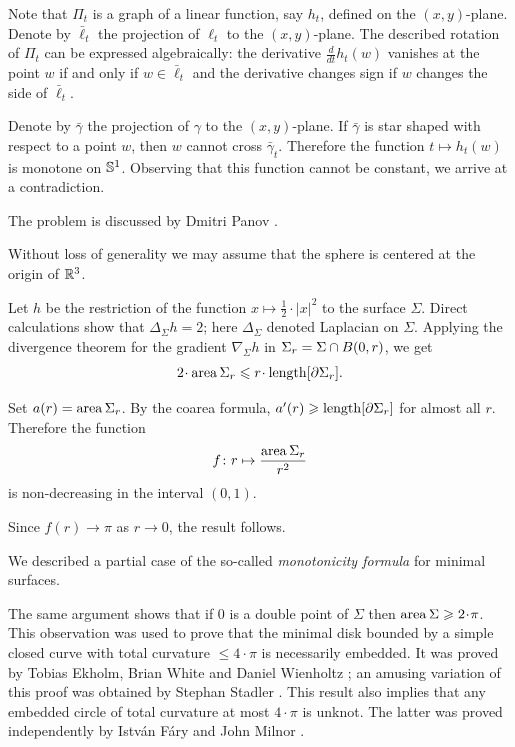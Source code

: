 Note that $\Pi_t$ is a graph of a linear function, say $h_t$, defined on the $(x, y)$-plane.
Denote by $\bar\ell_t$ the projection of $\ell_t$ to the $(x, y)$-plane.
The described rotation of $\Pi_t$ can be expressed algebraically:
the derivative $\tfrac{d}{dt}h_t(w)$ vanishes at the point $w$ if and only if $w\in \bar\ell_t$ 
and the derivative changes sign if $w$ changes the side of $\bar\ell_t$.

Denote by $\bar\gamma$ the projection of $\gamma$ to the $(x, y)$-plane.
If $\bar\gamma$ is star shaped with respect to a point $w$, then $w$ cannot cross $\bar\gamma_t$.
Therefore the function $t\mapsto h_t(w)$ is monotone on $\mathbb{S}^1$.
Observing that this function cannot be constant, we arrive at a contradiction.\qeds

The problem is discussed by Dmitri Panov \cite{panov-curves}.

Without loss of generality we may assume that the sphere is centered at the origin of $\mathbb{R}^3$.

Let $h$ be the restriction of the function $x\mapsto \tfrac12\cdot|x|^2$ to the surface $\Sigma$.
Direct calculations show that $\Delta_\Sigma h =  2$;
here $\Delta_\Sigma$ denoted Laplacian on $\Sigma$.
Applying the divergence theorem for the gradient $\nabla_\Sigma h$
in $\Sigma_r\z=\Sigma\cap B(0,r)$, we get
\[2\cdot \area\Sigma_r\le r\cdot\length [\partial\Sigma_r].\]

Set $a(r)=\operatorname{\rm area}\nolimits\Sigma_r$.
By the coarea formula, $a'(r)\geqslant\operatorname{\rm length} [\partial\Sigma_r]$ for almost all $r$.
Therefore the function
\[f\colon r\mapsto \frac{\operatorname{\rm area}\nolimits\Sigma_r}{r^2}
\]
is non-decreasing in the interval $(0,1)$.

Since $f(r)\to \pi$ as $r\to0$, the result follows.\qeds

We described a partial case of the so-called \emph{monotonicity formula} for minimal surfaces.

The same argument shows that if $0$ is a double point
of $\Sigma$ then $\area\Sigma\z\ge 2\cdot \pi$.
This observation was used to prove 
that the minimal disk bounded by a simple closed curve with total curvature $\le 4\cdot\pi$ 
is necessarily embedded.
It was proved by 
Tobias Ekholm, 
Brian White 
and Daniel Wienholtz
\cite{EWW};
an amusing variation of this proof
was obtained by 
Stephan Stadler \cite{stadler-FM}.
This result also implies that any embedded circle of total curvature at most $4\cdot\pi$ is unknot.
The latter was proved independently by Istv{\'a}n F{\'a}ry \cite{fary-knot} and  John Milnor \cite{milnor}.

